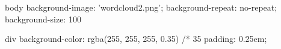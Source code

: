 body {
  background-image: 'wordcloud2.png';
  background-repeat: no-repeat;
  background-size: 100%
}

div {
  background-color: rgba(255, 255, 255, 0.35)   /* 35%
  padding: 0.25em;
}